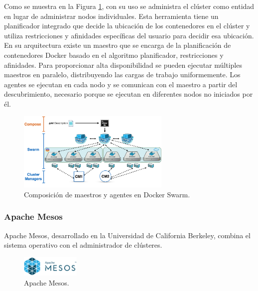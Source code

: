 
Como se muestra en la Figura \ref{fig:dockermasterandagent}, con su uso se administra el clúster como entidad en lugar de administrar nodos individuales. Esta herramienta tiene un planificador integrado que decide la ubicación de los contenedores en el clúster y utiliza restricciones y afinidades específicas del usuario para decidir esa ubicación. En su arquitectura existe un maestro que se encarga de la planificación de contenedores Docker basado en el algoritmo planificador, restricciones y afinidades. Para proporcionar alta disponibilidad se pueden ejecutar múltiples maestros en paralelo, distribuyendo las cargas de trabajo uniformemente. Los agentes se ejecutan en cada nodo y se comunican con el maestro a partir del descubrimiento, necesario porque se ejecutan en diferentes nodos no iniciados por él.

\begin{figure}[H]
\centering
\includegraphics[width=0.65\textwidth]{images/figures/dockermasterandagent.png}
\caption{Composición de maestros y agentes en Docker Swarm.\footnotemark \label{fig:dockermasterandagent}}
\end{figure}

	
\subsubsection{Apache Mesos}

Apache Mesos, desarrollado en la Universidad de California Berkeley, combina el sistema operativo con el administrador de clústeres.

\begin{figure}[H]
\centering
\includegraphics[width=0.25\textwidth]{images/figures/apachemesoslogo.png}
\caption{Apache Mesos.\footnotemark}
\end{figure}

